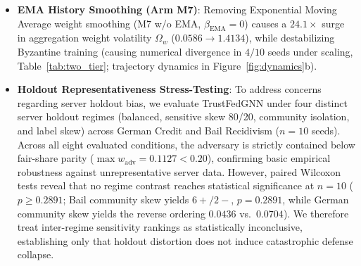 \begin{itemize}[leftmargin=*]
    \item \textbf{EMA History Smoothing (Arm M7)}: Removing Exponential Moving Average weight smoothing (M7 w/o EMA, $\beta_{\text{EMA}} = 0$) causes a $24.1\times$ surge in aggregation weight volatility $\Omega_w$ ($0.0586 \to 1.4134$), while destabilizing Byzantine training (causing numerical divergence in $4/10$ seeds under scaling, Table~\ref{tab:two_tier}; trajectory dynamics in Figure~\ref{fig:dynamics}b).
    \item \textbf{Holdout Representativeness Stress-Testing}: To address concerns regarding server holdout bias, we evaluate TrustFedGNN under four distinct server holdout regimes (balanced, sensitive skew 80/20, community isolation, and label skew) across German Credit and Bail Recidivism ($n=10$ seeds). Across all eight evaluated conditions, the adversary is strictly contained below fair-share parity ($\max w_{\mathrm{adv}} = 0.1127 < 0.20$), confirming basic empirical robustness against unrepresentative server data. However, paired Wilcoxon tests reveal that no regime contrast reaches statistical significance at $n=10$ ($p \ge 0.2891$; Bail community skew yields $6+/2-$, $p=0.2891$, while German community skew yields the reverse ordering $0.0436$ vs.\ $0.0704$). We therefore treat inter-regime sensitivity rankings as statistically inconclusive, establishing only that holdout distortion does not induce catastrophic defense collapse.
\end{itemize}





